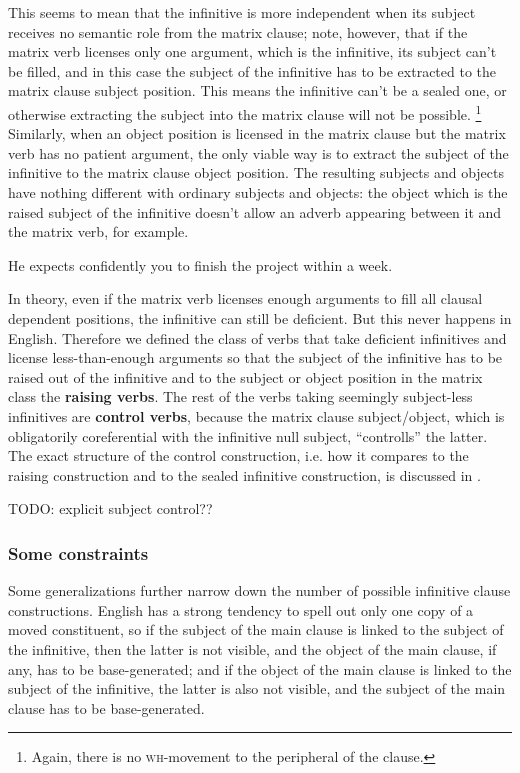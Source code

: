 \documentclass[UTF8, a4paper, oneside, scheme=plain, 12pt]{ctexbook}
\newcommand*{\concept}[1]{\textbf{#1}}
\newcommand{\category}[1]{\textsc{#1}}
\begin{document}
This seems to mean that the infinitive is more independent 
when its subject receives no semantic role from the matrix clause; 
note, however, that if the matrix verb licenses only one argument, 
which is the infinitive, its subject can't be filled, 
and in this case the subject of the infinitive has to be extracted 
to the matrix clause subject position.
This means the infinitive can't be a sealed one, 
or otherwise extracting the subject into the matrix clause will not be possible.%
\footnote{
    Again, there is no \category{wh}-movement to the peripheral of the clause.
}
Similarly, when an object position is licensed in the matrix clause 
but the matrix verb has no patient argument, 
the only viable way is to extract the subject of the infinitive to the matrix clause object position.
The resulting subjects and objects have nothing different with ordinary subjects and objects: 
the object which is the raised subject of the infinitive
doesn't allow an adverb appearing between it and the matrix verb, for example.

\begin{exe}
    \ex *He expects confidently you to finish the project within a week.
\end{exe}

In theory, even if the matrix verb licenses enough arguments 
to fill all clausal dependent positions, 
the infinitive can still be deficient.
But this never happens in English. 
Therefore we defined the class of verbs that take deficient infinitives 
and license less-than-enough arguments 
so that the subject of the infinitive has to be raised out of the infinitive 
and to the subject or object position in the matrix class
the \concept{raising verbs}.
The rest of the verbs taking seemingly subject-less infinitives are \concept{control verbs}, 
because the matrix clause subject/object, 
which is obligatorily coreferential with the infinitive null subject, 
``controlls'' the latter.
The exact structure of the control construction, 
i.e. how it compares to the raising construction and to the sealed infinitive construction, 
is discussed in .

TODO: explicit subject control??

\subsubsection{Some constraints}

Some generalizations further narrow down 
the number of possible infinitive clause constructions.
English has a strong tendency to spell out only one copy of a moved constituent,
so if the subject of the main clause is linked to the subject of the infinitive,
then the latter is not visible,
and the object of the main clause, if any, has to be base-generated;
and if the object of the main clause is linked to the subject of the infinitive,
the latter is also not visible,
and the subject of the main clause has to be base-generated.
\end{document}

